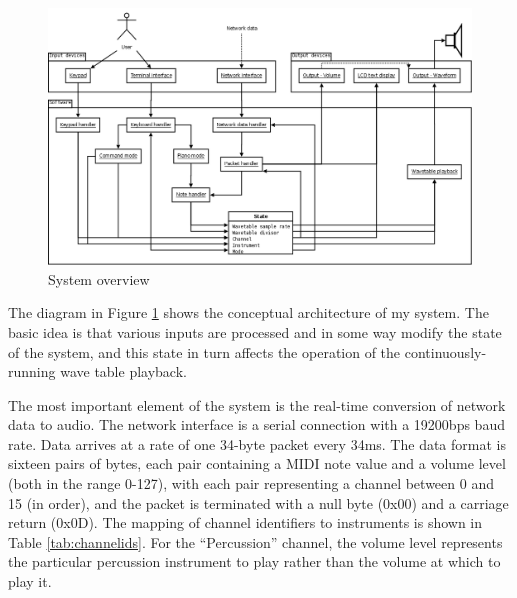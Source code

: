\documentclass[a4paper,10pt]{article}
\begin{document}
\begin{figure}[htbp]
\centering
\includegraphics[totalheight=0.55\textheight,angle=90]{images/overview.png}
\caption{System overview}\label{fig:systemoverview}
\end{figure}

The diagram in Figure \ref{fig:systemoverview} shows the conceptual architecture of my system.  The 
basic idea is that various inputs are processed and in some way modify the state of the system, and 
this state in turn affects the operation of the continuously-running wave table playback.

The most important element of the system is the real-time conversion of network data to audio.  The 
network interface is a serial connection with a 19200bps baud rate.  Data arrives at a rate of one 
34-byte packet every 34ms.  The data format is sixteen pairs of bytes, each pair containing a MIDI 
note value and a volume level (both in the range 0-127), with each pair representing a channel 
between 0 and 15 (in order), and the packet is terminated with a null byte (0x00) and a carriage 
return (0x0D).  The mapping of channel identifiers to instruments is shown in Table 
\ref{tab:channelids}.  For the ``Percussion'' channel, the volume level represents the particular 
percussion instrument to play rather than the volume at which to play it.
\end{document}
